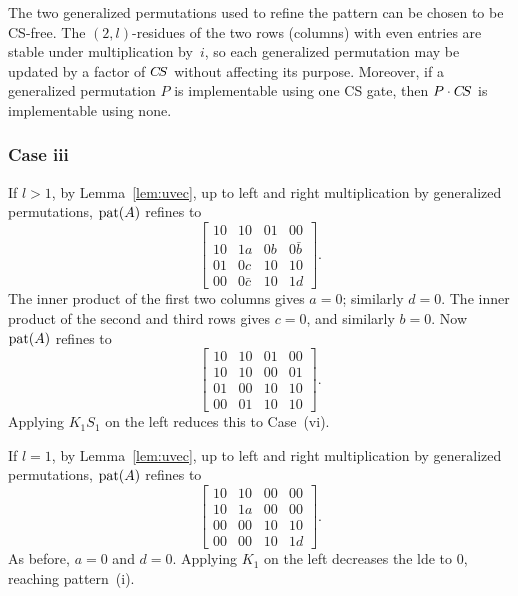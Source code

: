 \documentclass[reprint,amsmath,amssymb,aps,pra]{revtex4-2}
\begin{document}
\begin{remark}
  \label{rmk:dummy}
  The two generalized permutations used to refine the pattern can be
  chosen to be CS-free. The $(2,l)$-residues of the two rows (columns)
  with even entries are stable under multiplication by~$i$, so each
  generalized permutation may be updated by a factor of $C\kern-.16667em S$ without
  affecting its purpose. Moreover, if a generalized permutation $P$ is
  implementable using one CS gate, then $P\cdot C\kern-.16667em S$ is implementable
  using none.
\end{remark}

\subsubsection{Case iii}
If $l>1$, by Lemma~\ref{lem:uvec}, up to left and right multiplication
by generalized permutations, $\operatorname{pat}(A)$ refines to
\[
  \begin{bmatrix}
    10 & 10       & 01 & 00       \\
    10 & 1a       & 0b & 0\bar{b} \\
    01 & 0c       & 10 & 10       \\
    00 & 0\bar{c} & 10 & 1d
  \end{bmatrix}.
\]
The inner product of the first two columns gives $a = 0$; similarly
$d=0$. The inner product of the second and third rows gives $c = 0$,
and similarly $b = 0$. Now $\operatorname{pat}(A)$ refines to
\[
  \begin{bmatrix}
    10 & 10 & 01 & 00 \\
    10 & 10 & 00 & 01 \\
    01 & 00 & 10 & 10 \\
    00 & 01 & 10 & 10
  \end{bmatrix}.
\]
Applying $K_1S_1$ on the left reduces this to Case~(vi).

If $l=1$, by Lemma~\ref{lem:uvec}, up to left and right multiplication
by generalized permutations, $\operatorname{pat}(A)$ refines to
\[
  \begin{bmatrix}
    10 & 10 & 00 & 00 \\
    10 & 1a & 00 & 00 \\
    00 & 00 & 10 & 10 \\
    00 & 00 & 10 & 1d
  \end{bmatrix}.
\]
As before, $a=0$ and $d=0$. Applying $K_1$ on the left decreases the
lde to 0, reaching pattern~(i).
\end{document}
